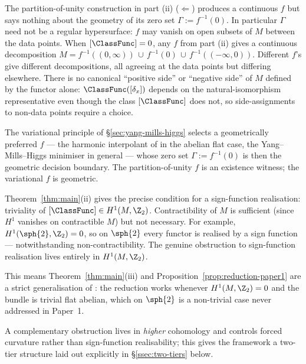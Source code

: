 \begin{remark}\label{rem:boundary-structure}
The partition-of-unity construction in part (ii)
($\Leftarrow$) produces a continuous $f$ but says nothing about the
geometry of its zero set $\Gamma:=f^{-1}(0)$. In particular $\Gamma$
need not be a regular hypersurface: $f$ may vanish on open subsets
of $M$ between the data points. When $[\ClassFunc]=0$, any $f$ from
part (ii) gives a continuous decomposition
$M=f^{-1}((0,\infty))\,\cup\,f^{-1}(0)\,\cup\,f^{-1}((-\infty,0))$.
Different $f$'s give different decompositions, all agreeing at the
data points but differing elsewhere. There is no canonical
``positive side'' or ``negative side'' of $M$ defined by the functor
alone: $\ClassFunc([\delta_x])$ depends on the natural-isomorphism
representative even though the class $[\ClassFunc]$ does not, so
side-assignments to non-data points require a choice.

The variational principle of \S\ref{sec:yang-mills-higgs} selects a
geometrically preferred $f$ --- the harmonic interpolant of
\cite[Theorem~13.3]{Vasii2026Paper1} in the abelian flat case, the
Yang--Mills--Higgs minimiser in general --- whose zero set
$\Gamma:=f^{-1}(0)$ is then the geometric decision boundary. The
partition-of-unity $f$ is an existence witness; the variational $f$
is geometric.
\end{remark}

\begin{remark}\label{rem:not-contractible}
Theorem~\ref{thm:main}(ii) gives the precise condition for a
sign-function realisation: triviality of
$[\ClassFunc]\in H^1(M,\Z_2)$. Contractibility of $M$ is sufficient
(since $H^1$ vanishes on contractible $M$) but not necessary. For
example, $H^1(\sph{2},\Z_2)=0$, so on $\sph{2}$ every functor is
realised by a sign function --- notwithstanding non-contractibility.
The genuine obstruction to sign-function realisation lives entirely
in $H^1(M,\Z_2)$.

This means Theorem~\ref{thm:main}(iii) and
Proposition~\ref{prop:reduction-paper1} are a strict generalisation
of \cite{Vasii2026Paper1}: the reduction works whenever
$H^1(M,\Z_2)=0$ and the bundle is trivial flat abelian, which on
$\sph{2}$ is a non-trivial case never addressed in Paper~1.

A complementary obstruction lives in \emph{higher} cohomology and
controls forced curvature rather than sign-function realisability;
this gives the framework a two-tier structure laid out explicitly
in \S\ref{ssec:two-tiers} below.
\end{remark}

